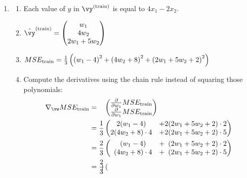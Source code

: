 \documentclass{article}
\newcommand{\utrain}{^{\textnormal{(train)}}}
\newcommand{\strain}{_{\textnormal{train}}}
\begin{document}
\begin{enumerate}

\item \label{ML_ex_regression_solution}
\begin{enumerate}
    \item Each value of $y$ in $\vy\utrain$ is equal to $4x_1 - 2x_2$.
    \item $\hat{\vy}\utrain = \begin{pmatrix} w_1\\ 4w_2 \\ 2w_1 + 5w_2 \end{pmatrix}$
    \item $MSE\strain = \frac13\left(\left(w_1-4\right)^2 + \left(4w_2+8\right)^2+\left(2w_1+5w_2+2\right)^2\right)$ 
    \item Compute the derivatives using the chain rule instead of squaring those polynomials:
    \begin{align*} \nabla_\vw MSE\strain & = \phantom{\frac13} \begin{pmatrix}
                                            \frac{\partial}{\partial w_1}MSE\strain   \\ 
                                            \frac{\partial}{\partial w_1}MSE\strain
                                            \end{pmatrix} \\
                              & = \frac13 \begin{pmatrix}
                                            2(w_1-4)        & + 2(2w_1+5w_2+2)\cdot 2 \\ 
                                            2(4w_2+8)\cdot4 & + 2(2w_1+5w_2+2)\cdot 5
                                            \end{pmatrix} \\
                              & = \frac23 \begin{pmatrix}
                                            \phantom2(w_1-4)         & + \phantom2(2w_1+5w_2+2)\cdot 2  \\ 
                                            \phantom2(4w_2+8)\cdot4  & + \phantom2(2w_1+5w_2+2)\cdot 5
                                            \end{pmatrix} \\
                              & = \frac23 \begin{pmatrix}

\end{pmatrix}
\end{align*}
\end{enumerate}
\end{enumerate}
\end{document}
